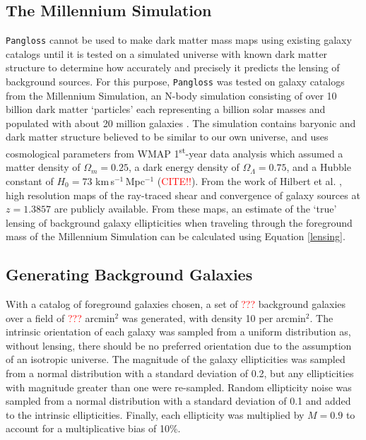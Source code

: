 \documentclass[%
 reprint,
 amsmath,amssymb,
 aps,nofootinbib
]{revtex4-1}
\begin{document}
\subsection{The Millennium Simulation}
\texttt{Pangloss} cannot be used to make dark matter mass maps using existing galaxy catalogs until it is tested on a simulated universe with known dark matter structure to determine how accurately and precisely it predicts the lensing of background sources. For this purpose, \texttt{Pangloss} was tested on galaxy catalogs from the Millennium Simulation, an N-body simulation consisting of over 10 billion dark matter `particles' each representing a billion solar masses and populated with about 20 million galaxies \cite{millennium_simulation}. The simulation contains baryonic and dark matter structure believed to be similar to our own universe, and uses cosmological parameters from WMAP 1\textsuperscript{st}-year data analysis which assumed a matter density of $\Omega_m=0.25$, a dark energy density of $\Omega_\Lambda=0.75$, and a Hubble constant of $H_0=73$ km$\,$s$^{-1}\,$Mpc$^{-1}$ (\textcolor{red}{CITE!!}). From the work of Hilbert et al. \cite{ray_tracing}, high resolution maps of the ray-traced shear and convergence of galaxy sources at $z=1.3857$ are publicly available. From these maps, an estimate of the `true' lensing of background galaxy ellipticities when traveling through the foreground mass of the Millennium Simulation can be calculated using Equation \eqref{lensing}.


\subsection{Generating Background Galaxies}
With a catalog of foreground galaxies chosen, a set of \textcolor{red}{???} background galaxies over a field of \textcolor{red}{???} arcmin$^2$ was generated, with density 10 per arcmin$^2$. The intrinsic orientation of each galaxy was sampled from a uniform distribution as, without lensing, there should be no preferred orientation due to the assumption of an isotropic universe. The magnitude of the galaxy ellipticities was sampled from a normal distribution with a standard deviation of 0.2, but any ellipticities with magnitude greater than one were re-sampled. Random ellipticity noise was sampled from a normal distribution with a standard deviation of 0.1 and added to the intrinsic ellipticities. Finally, each ellipticity was multiplied by $M=0.9$ to account for a multiplicative bias of 10\%.
\end{document}
